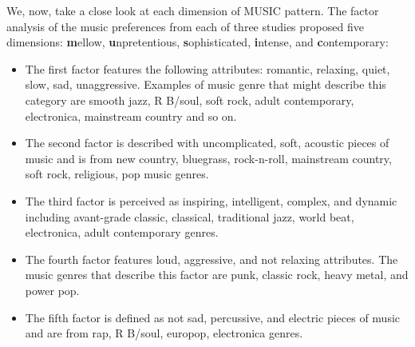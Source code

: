 We, now, take a close look at each dimension of MUSIC pattern.
The factor analysis of the music preferences from each of three studies proposed five dimensions:
\textbf{m}ellow, \textbf{u}npretentious, \textbf{s}ophisticated, \textbf{i}ntense, and \textbf{c}ontemporary:
\begin{itemize}
\item The first factor features the following attributes: romantic, relaxing, quiet, slow, sad, unaggressive.
      Examples of music genre that might describe this category are smooth jazz, R B/soul, soft rock,
      adult contemporary, electronica, mainstream country and so on.
\item The second factor is described with uncomplicated, soft, acoustic pieces of music and is from new country,
      bluegrass, rock-n-roll, mainstream country, soft rock, religious, pop music genres.
\item The third factor is perceived as inspiring, intelligent, complex, and dynamic including
      avant-grade classic, classical, traditional jazz, world beat, electronica, adult contemporary genres.
\item The fourth factor features loud, aggressive, and not relaxing attributes.
      The music genres that describe this factor are punk, classic rock, heavy metal, and power pop.
\item The fifth factor is defined as not sad, percussive, and electric pieces of
      music and are from rap, R B/soul, europop, electronica genres.
\end{itemize}

